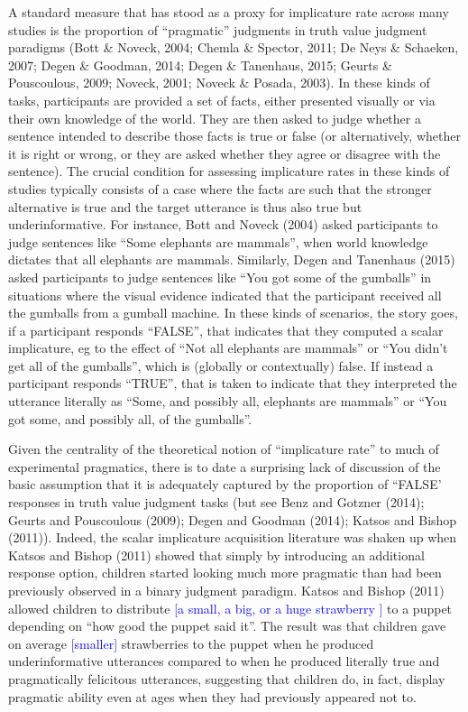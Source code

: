 \documentclass[man]{apa6}
\newcommand{\change}[1]{\textcolor{Blue}{[#1]}}
\theoremstyle{definition}
\theoremstyle{definition}
\theoremstyle{definition}
\theoremstyle{remark}
\begin{document}
A standard measure that has stood as a proxy for implicature rate across
many studies is the proportion of \enquote{pragmatic} judgments in truth
value judgment paradigms (Bott \& Noveck, 2004; Chemla \& Spector, 2011;
De Neys \& Schaeken, 2007; Degen \& Goodman, 2014; Degen \& Tanenhaus,
2015; Geurts \& Pouscoulous, 2009; Noveck, 2001; Noveck \& Posada,
2003). In these kinds of tasks, participants are provided a set of
facts, either presented visually or via their own knowledge of the
world. They are then asked to judge whether a sentence intended to
describe those facts is true or false (or alternatively, whether it is
right or wrong, or they are asked whether they agree or disagree with
the sentence). The crucial condition for assessing implicature rates in
these kinds of studies typically consists of a case where the facts are
such that the stronger alternative is true and the target utterance is
thus also true but underinformative. For instance, Bott and Noveck
(2004) asked participants to judge sentences like \enquote{Some
elephants are mammals}, when world knowledge dictates that all elephants
are mammals. Similarly, Degen and Tanenhaus (2015) asked participants to
judge sentences like \enquote{You got some of the gumballs} in
situations where the visual evidence indicated that the participant
received all the gumballs from a gumball machine. In these kinds of
scenarios, the story goes, if a participant responds \enquote{FALSE},
that indicates that they computed a scalar implicature, eg to the effect
of \enquote{Not all elephants are mammals} or \enquote{You didn't get
all of the gumballs}, which is (globally or contextually) false. If
instead a participant responds \enquote{TRUE}, that is taken to indicate
that they interpreted the utterance literally as ``Some, and possibly
all, elephants are mammals'' or \enquote{You got some, and possibly all,
of the gumballs}.

Given the centrality of the theoretical notion of \enquote{implicature
rate} to much of experimental pragmatics, there is to date a surprising
lack of discussion of the basic assumption that it is adequately
captured by the proportion of ``FALSE' responses in truth value judgment
tasks (but see Benz and Gotzner (2014); Geurts and Pouscoulous (2009);
Degen and Goodman (2014); Katsos and Bishop (2011)). Indeed, the scalar
implicature acquisition literature was shaken up when Katsos and Bishop
(2011) showed that simply by introducing an additional response option,
children started looking much more pragmatic than had been previously
observed in a binary judgment paradigm. Katsos and Bishop (2011) allowed
children to distribute \change{a small, a big, or a huge strawberry } to a puppet depending on
\enquote{how good the puppet said it}. The result was that children gave
on average \change{smaller} strawberries to the puppet when he produced
underinformative utterances compared to when he produced literally true
and pragmatically felicitous utterances, suggesting that children do, in
fact, display pragmatic ability even at ages when they had previously
appeared not to.
\end{document}
